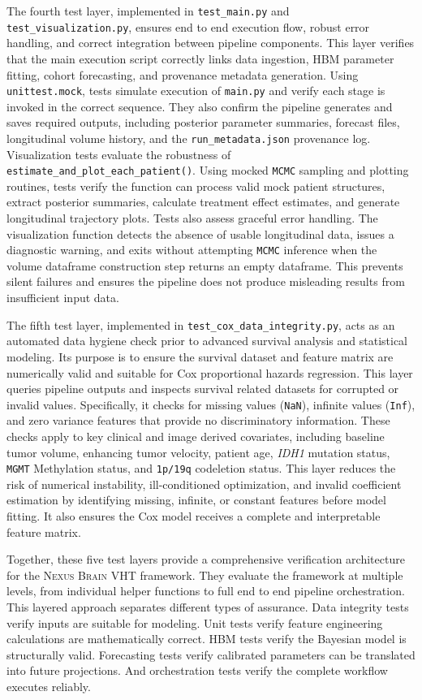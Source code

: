The fourth test layer, implemented in \texttt{test\_main.py} and \texttt{test\_visualization.py}, ensures end to end execution flow, robust error handling, and correct integration between pipeline components. This layer verifies that the main execution script correctly links data ingestion, HBM parameter fitting, cohort forecasting, and provenance metadata generation. Using \texttt{unittest.mock}, tests simulate execution of \texttt{main.py} and verify each stage is invoked in the correct sequence. They also confirm the pipeline generates and saves required outputs, including posterior parameter summaries, forecast files, longitudinal volume history, and the \texttt{run\_metadata.json} provenance log. Visualization tests evaluate the robustness of \texttt{estimate\_and\_plot\_each\_patient()}. Using mocked \texttt{MCMC} sampling and plotting routines, tests verify the function can process valid mock patient structures, extract posterior summaries, calculate treatment effect estimates, and generate longitudinal trajectory plots. Tests also assess graceful error handling. The visualization function detects the absence of usable longitudinal data, issues a diagnostic warning, and exits without attempting \texttt{MCMC} inference when the volume dataframe construction step returns an empty dataframe. This prevents silent failures and ensures the pipeline does not produce misleading results from insufficient input data.

The fifth test layer, implemented in \texttt{test\_cox\_data\_integrity.py}, acts as an automated data hygiene check prior to advanced survival analysis and statistical modeling. Its purpose is to ensure the survival dataset and feature matrix are numerically valid and suitable for Cox proportional hazards regression. This layer queries pipeline outputs and inspects survival related datasets for corrupted or invalid values. Specifically, it checks for missing values (\texttt{NaN}), infinite values (\texttt{Inf}), and zero variance features that provide no discriminatory information. These checks apply to key clinical and image derived covariates, including baseline tumor volume, enhancing tumor velocity, patient age, \textit{IDH1} mutation status, \texttt{MGMT} Methylation status, and \texttt{1p/19q} codeletion status. This layer reduces the risk of numerical instability, ill-conditioned optimization, and invalid coefficient estimation by identifying missing, infinite, or constant features before model fitting. It also ensures the Cox model receives a complete and interpretable feature matrix.

Together, these five test layers provide a comprehensive verification architecture for the \textsc{Nexus Brain} VHT framework. They evaluate the framework at multiple levels, from individual helper functions to full end to end pipeline orchestration. This layered approach separates different types of assurance. Data integrity tests verify inputs are suitable for modeling. Unit tests verify feature engineering calculations are mathematically correct. HBM tests verify the Bayesian model is structurally valid. Forecasting tests verify calibrated parameters can be translated into future projections. And orchestration tests verify the complete workflow executes reliably.

